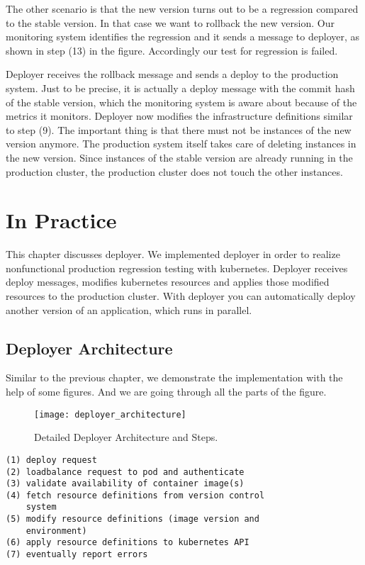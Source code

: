 The other scenario is that the new version turns out to be a regression compared to the
stable version. In that case we want to rollback the new version. Our monitoring system
identifies the regression and it sends a message to deployer, as shown in step (13) in the
figure. Accordingly our test for regression is failed.

Deployer receives the rollback message and sends a deploy to the production system. Just
to be precise, it is actually a deploy message with the commit hash of the stable version,
which the monitoring system is aware about because of the metrics it monitors. Deployer
now modifies the infrastructure definitions similar to step (9). The important thing is
that there must not be instances of the new version anymore. The production system itself
takes care of deleting instances in the new version. Since instances of the stable version
are already running in the production cluster, the production cluster does not touch the
other instances.

\chapter{In Practice}

This chapter discusses deployer. We implemented deployer in order to realize nonfunctional
production regression testing with kubernetes. Deployer receives deploy messages, modifies
kubernetes resources and applies those modified resources to the production cluster. With
deployer you can automatically deploy another version of an application, which runs in
parallel.


\section{Deployer Architecture}

Similar to the previous chapter, we demonstrate the implementation with the help of some
figures. And we are going through all the parts of the figure.

\begin{figure}[htbp]
  \centering
  \texttt{[image: deployer\_architecture]}
  \caption[nprtflow]{Detailed Deployer Architecture and Steps.}
  \label{fig:deployer_architecture}
\end{figure}

\begin{verbatim}
(1) deploy request
(2) loadbalance request to pod and authenticate
(3) validate availability of container image(s)
(4) fetch resource definitions from version control
    system
(5) modify resource definitions (image version and
    environment)
(6) apply resource definitions to kubernetes API
(7) eventually report errors
\end{verbatim}

